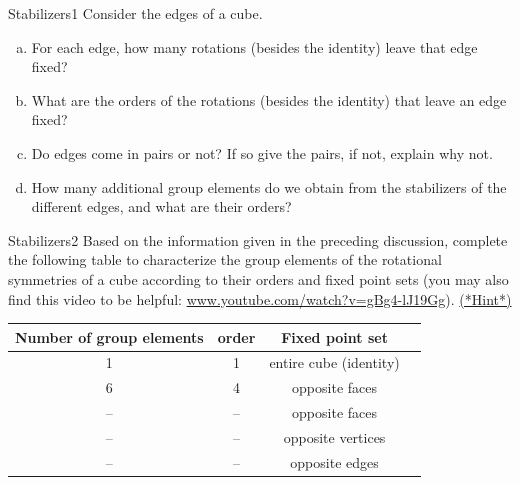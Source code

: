 \begin{exercise}{Stabilizers1}
Consider the edges of a cube.
\begin{enumerate}[(a)]
\item
For each edge, how many rotations (besides the identity) leave that edge fixed?
\item
What are the orders of the rotations (besides the identity) that leave an edge fixed?
\item
Do edges come in pairs or not?  If so give the pairs, if not, explain why not.
\item
How many additional group elements do we obtain from the stabilizers of the different edges, and what are their orders? 
\end{enumerate}
\end{exercise}
\begin{exercise}{Stabilizers2}
Based on the information given in the preceding discussion, complete the following table to characterize the group elements of the rotational symmetries of a cube according to their orders and fixed point sets (you may also find this video to be helpful: \url{www.youtube.com/watch?v=gBg4-lJ19Gg}).
\hyperref[sec:actions:hints]{(*Hint*)}

\begin{tabular}{| c |c|c| r |}\hline
 \textbf{ Number of group elements} & \textbf{order} & \textbf{Fixed point set} \\ \hline
  1 & 1 & entire cube (identity) \\ \hline
  6 & 4 & opposite faces \\ \hline
 -- & -- & opposite faces \\ \hline
-- & -- & opposite vertices \\ \hline
-- & -- & opposite edges \\ \hline
\end{tabular}
\end{exercise}
